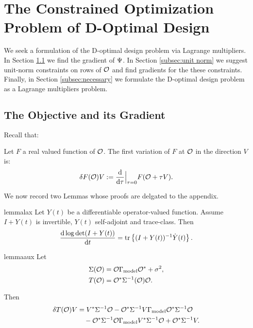 \section{The Constrained Optimization Problem of D-Optimal Design}\label{section:D and grad}

We seek a formulation of the D-optimal design problem
\cite{AlexanderianGloorGhattas14} via Lagrange multipliers. In Section
\ref{section:objective} we find the gradient of $\Psi$. In Section
\ref{subsec:unit norm} we suggest unit-norm constraints on rows of
$\mathcal{O}$ and find gradients for the these constraints. Finally, in Section
\ref{subsec:necessary} we formulate the D-optimal design problem as a
Lagrange multipliers problem.


\subsection{The Objective and its Gradient}\label{section:objective}
Recall that:


\begin{definition}\label{def:var}
  Let $F$ a real valued function of $\mathcal{O}$. The first variation of $F$
  at $\mathcal{O}$ in the direction $V$ is:
  \begin{equation*}
    \delta F(\obs) V := \frac{\der}{\der \tau}\Big |_{\tau=0}  F( \obs + \tau V).
  \end{equation*}
\end{definition}

We now record two Lemmas whose proofs are delgated to the appendix.

\begin{restatable*}{lemma}{lax}\label{lemma:lax}
  Let $Y(t)$ be a differentiable operator-valued function. Assume 
  $I+Y(t)$ is invertible, $Y(t)$ self-adjoint and trace-class. Then
  \begin{equation*}
    \frac{\der \log \det (I+Y(t))}{\der t} = \tr{(I+Y(t))^{-1} \dot{Y}(t)}.
  \end{equation*}
\end{restatable*}

\begin{restatable*}{lemma}{aux}\label{lemma:aux calc}
  Let
  \begin{align*}
    \begin{split}
      \Sigma(\obs) &= \obs\modcov\obs^* + \sigma^2, \\
      T(\obs) &= \obs^* \Sigma^{-1}(\obs)\obs.
    \end{split}
  \end{align*}

  Then
  \begin{align*}
    \delta T(\obs)V &= V^* \Sigma^{-1} \obs 
    - \obs^*\Sigma^{-1} V\modcov \obs^* \Sigma^{-1}\obs \\
    &\ \ \ - \obs^* \Sigma^{-1} \obs \modcov V^* \Sigma^{-1}\obs
    + \obs^* \Sigma^{-1} V.
  \end{align*}
\end{restatable*}


